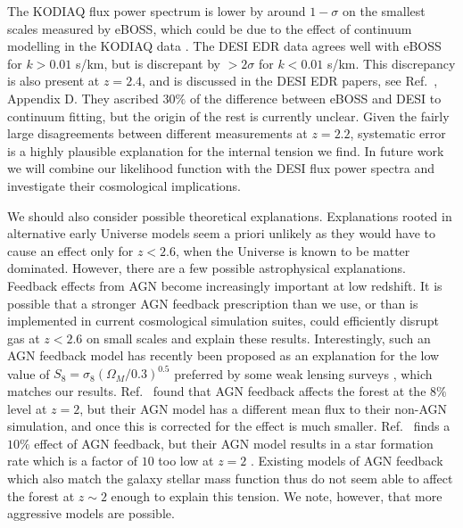 The KODIAQ flux power spectrum is lower by around $1-\sigma$ on the smallest scales measured by eBOSS, which could be due to the effect of continuum modelling in the KODIAQ data \cite{2022MNRAS.509.2842K}.
The DESI EDR data agrees well with eBOSS for $k > 0.01$ s/km, but is discrepant by $> 2 \sigma$ for $k < 0.01$ s/km.
This discrepancy is also present at $z=2.4$, and is discussed in the DESI EDR papers, see Ref.~\cite{2023arXiv230606311R}, Appendix D.
They ascribed $30\%$ of the difference between eBOSS and DESI to continuum fitting, but the origin of the rest is currently unclear.
Given the fairly large disagreements between different measurements at $z=2.2$, systematic error is a highly plausible explanation for the internal tension we find.
In future work we will combine our likelihood function with the DESI flux power spectra and investigate their cosmological implications.

We should also consider possible theoretical explanations.
Explanations rooted in alternative early Universe models seem a priori unlikely as they would have to cause an effect only for $z < 2.6$, when the Universe is known to be matter dominated. 
However, there are a few possible astrophysical explanations.
Feedback effects from AGN become increasingly important at low redshift.
It is possible that a stronger AGN feedback prescription than we use, or than is implemented in current cosmological simulation suites, could efficiently disrupt gas at $z < 2.6$ on small scales and explain these results.
Interestingly, such an AGN feedback model has recently been proposed as an explanation for the low value of $S_8 = \sigma_8 (\Omega_M/0.3)^{0.5}$ preferred by some weak lensing surveys \cite{2022MNRAS.516.5355A}, which matches our results.
Ref.~\cite{2020MNRAS.495.1825C} found that AGN feedback affects the forest at the $8\%$ level at $z=2$, but their AGN model has a different mean flux to their non-AGN simulation, and once this is corrected for the effect is much smaller. Ref.~\cite{2013MNRAS.429.1734V} finds a $10\%$ effect of AGN feedback, but their AGN model results in a star formation rate which is a factor of $10$ too low at $z=2$ \cite{2010MNRAS.402.1536S}. Existing models of AGN feedback which also match the galaxy stellar mass function thus do not seem able to affect the \Lya forest at $z \sim 2$ enough to explain this tension. We note, however, that more aggressive models are possible.

